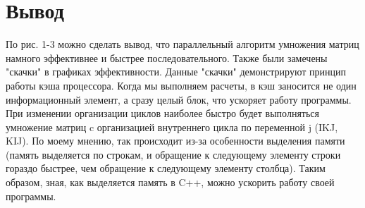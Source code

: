 \documentclass[12pt]{article}
\begin{document}
\section{Вывод}
По рис. 1-3 можно сделать вывод, что параллельный алгоритм умножения матриц намного эффективнее и быстрее последовательного.
Также были замечены "скачки" в графиках эффективности. Данные "скачки" демонстрируют принцип работы кэша процессора. Когда мы выполняем расчеты, в кэш заносится не один информационный элемент, а сразу целый блок, что ускоряет работу программы. При изменении организации циклов наиболее быстро будет выполняться умножение матриц c организацией внутреннего цикла по переменной j (IKJ, KIJ). По моему мнению, так происходит из-за особенности выделения памяти (память выделяется по строкам, и обращение к следующему элементу строки гораздо быстрее, чем обращение к следующему элементу столбца). Таким образом, зная, как выделяется память в C++, можно ускорить работу своей программы.
\end{document}
